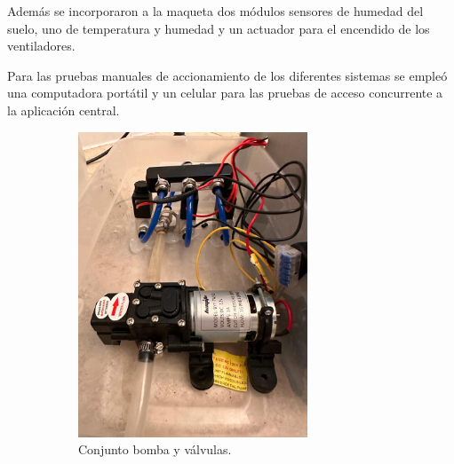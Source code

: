Además se incorporaron a la maqueta dos módulos sensores de humedad del suelo, uno de temperatura y humedad y un actuador para el encendido de los ventiladores.

Para las pruebas manuales de accionamiento de los diferentes sistemas se empleó una computadora portátil y un celular para las pruebas de acceso concurrente a la aplicación central.

\begin{figure}[htpb]
     \centering
       \begin{subfigure}[b]{0.45\textwidth}
	    \centering
		 \includegraphics[width=0.75\textwidth]{./Figures/chapter4/pump_2.jpg}
		\caption{Conjunto bomba y válvulas.}
		\label{fig:pump}
     \end{subfigure}
          \hfill
     \begin{subfigure}[b]{0.45\textwidth}
		\centering

\end{subfigure}
\end{figure}
